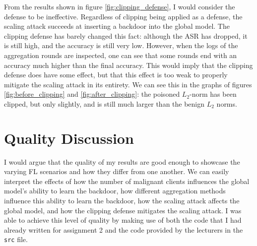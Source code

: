 \documentclass{article}
\begin{document}
From the results shown in figure \ref{fig:clipping_defense}, I would consider the defense to be ineffective.
Regardless of clipping being applied as a defense, the scaling attack succeeds at inserting a backdoor into the global model.
The clipping defense has barely changed this fact: although the ASR has dropped, it is still high, and the accuracy is still very low.
However, when the logs of the aggregation rounds are inspected, one can see that some rounds end with an accuracy much higher than the final accuracy.
This would imply that the clipping defense does have some effect, but that this effect is too weak to properly mitigate the scaling attack in its entirety.
We can see this in the graphs of figures \ref{fig:before_clipping} and \ref{fig:after_clipping}: the poisoned $L_2$-norm has been clipped, but only slightly, and is still much larger than the benign $L_2$ norms.

\section{Quality Discussion}
I would argue that the quality of my results are good enough to showcase the varying FL scenarios and how they differ from one another.
We can easily interpret the effects of how the number of malignant clients influences the global model's ability to learn the backdoor, how different aggregation methods influence this ability to learn the backdoor, how the scaling attack affects the global model, and how the clipping defense mitigates the scaling attack.
I was able to achieve this level of quality by making use of both the code that I had already written for assignment 2 and the code provided by the lecturers in the \texttt{src} file.
\end{document}
